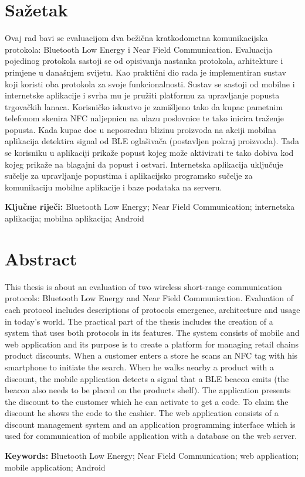 \chapter*{Sa\v{z}etak}
Ovaj rad bavi se evaluacijom dva be\v{z}i\v{c}na kratkodometna komunikacijska protokola: Bluetooth Low Energy i Near Field Communication. Evaluacija pojedinog protokola sastoji se od opisivanja nastanka protokola, arhitekture i primjene u dana\v{s}njem svijetu. Kao prakti\v{c}ni dio rada je implementiran sustav koji koristi oba protokola za svoje funkcionalnosti. Sustav se sastoji od mobilne i internetske aplikacije i svrha mu je pru\v{z}iti platformu za upravljanje popusta trgova\v{c}kih lanaca. Korisni\v{c}ko iskustvo je zami\v{s}ljeno tako da kupac pametnim telefonom skenira NFC naljepnicu na ulazu poslovnice te tako inicira tra\v{z}enje popusta. Kada kupac do\dj e u neposrednu blizinu proizvoda na akciji mobilna aplikacija detektira signal od BLE ogla\v{s}iva\v{c}a (postavljen pokraj proizvoda). Tada se korisniku u aplikaciji prika\v{z}e popust kojeg mo\v{z}e aktivirati te tako dobiva kod kojeg prika\v{z}e na blagajni da popust i ostvari. Internetska aplikacija uklju\v{c}uje su\v{c}elje za upravljanje popustima i aplikacijsko programsko su\v{c}elje za komunikaciju mobilne aplikacije i baze podataka na serveru.


\vspace{1.5\baselineskip}

\noindent \textbf{Klju\v{c}ne rije\v{c}i:} Bluetooth Low Energy; Near Field Communication; internetska aplikacija; mobilna aplikacija; Android

\chapter*{Abstract}

This thesis is about an evaluation of two wireless short-range communication protocols: Bluetooth Low Energy and Near Field Communication. Evaluation of each protocol includes descriptions of protocols emergence, architecture and usage in today's world. The practical part of the thesis includes the creation of a system that uses both protocols in its features. The system consists of mobile and web application and its purpose is to create a platform for managing retail chains product discounts. When a customer enters a store he scans an NFC tag with his smartphone to initiate the search. When he walks nearby a product with a discount, the mobile application detects a signal that a BLE beacon emits (the beacon also needs to be placed on the products shelf). The application presents the discount to the customer which he can activate to get a code. To claim the discount he shows the code to the cashier. The web application consists of a discount management system and an application programming interface which is used for communication of mobile application with a database on the web server.

\vspace{1.5\baselineskip}
\noindent \textbf{Keywords:} Bluetooth Low Energy; Near Field Communication; web application; mobile application; Android
